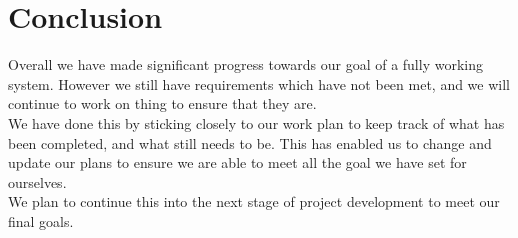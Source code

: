 \section{Conclusion}
	Overall we have made significant progress towards our goal of a fully working system. However we still have requirements which have not been met, and we will continue to work on thing to ensure that they are.\\
	We have done this by sticking closely to our work plan to keep track of what has been completed, and what still needs to be. This has enabled us to change and update our plans to ensure we are able to meet all the goal we have set for ourselves.\\
	We plan to continue this into the next stage of project development to meet our final goals.\\
